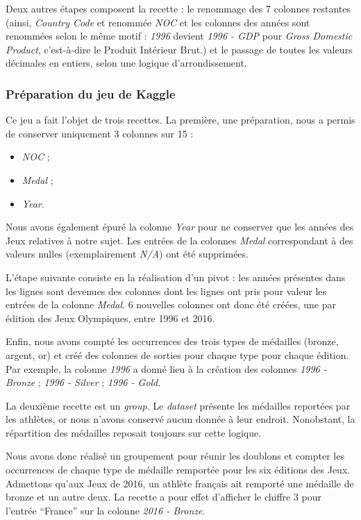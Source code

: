 \documentclass[hidelinks, 12pt]{article}
\begin{document}
Deux autres étapes composent la recette : le renommage des 7 colonnes restantes (ainsi, \emph{Country Code } et renommée \emph{NOC} et les colonnes des années sont renommées selon le même motif : \emph{1996} devient \emph{1996 - GDP} pour \emph{Gross Domestic Product}, c'est-à-dire le Produit Intérieur Brut.) et le passage de toutes les valeurs décimales en entiers, selon une logique d'arrondissement. 

\subsubsection{Préparation du jeu de Kaggle}

Ce jeu a fait l'objet de trois recettes. La première, une préparation, nous a permis de conserver uniquement 3 colonnes sur 15 :
\begin{itemize}
	\item \emph{NOC} ;
	\item \emph{Medal} ;
	\item \emph{Year}.
\end{itemize}
Nous avons également épuré la colonne \emph{Year} pour ne conserver que les années des Jeux relatives à notre sujet. Les entrées de la colonnes \emph{Medal} correspondant à des valeurs nulles (exemplairement \emph{N/A}) ont été supprimées. 

L'étape suivante consiste en la réalisation d'un pivot : les années présentes dans les lignes sont devenues des colonnes dont les lignes ont pris pour valeur les entrées de la colonne \emph{Medal}. 6 nouvelles colonnes ont donc été créées, une par édition des Jeux Olympiques, entre 1996 et 2016.

Enfin, nous avons compté les occurrences des trois types de médailles (bronze, argent, or) et créé des colonnes de sorties pour chaque type pour chaque édition. Par exemple, la colonne \emph{1996} a donné lieu à la création des colonnes \emph{1996 - Bronze} ; \emph{1996 - Silver} ; \emph{1996 - Gold}.

La deuxième recette est un \emph{group}. Le \emph{dataset} présente les médailles reportées par les athlètes, or nous n'avons conservé aucun donnée à leur endroit. Nonobstant, la répartition des médailles reposait toujours sur cette logique.

Nous avons donc réalisé un groupement pour réunir les doublons et compter les occurrences de chaque type de médaille remportée pour les six éditions des Jeux. Admettons qu'aux Jeux de 2016, un athlète français ait remporté une médaille de bronze et un autre deux. La recette a pour effet d'afficher le chiffre 3 pour l'entrée \enquote{France} sur la colonne \emph{2016 - Bronze}.
\end{document}
